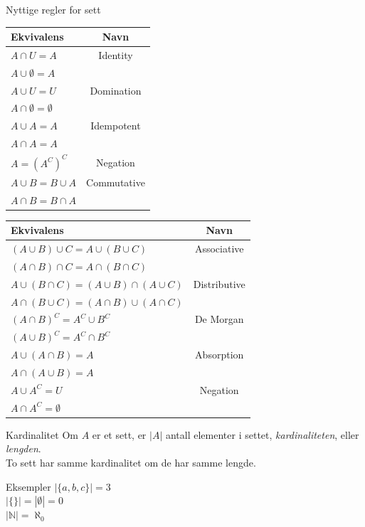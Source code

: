 \begin{frame}{Nyttige regler for sett}
        \begin{tabular}{l|c}
        Ekvivalens & Navn \\ \hline
        $A \cap U = A$ & Identity\\
        $A \cup \emptyset = A$ \\ \hline
        
        $A \cup U = U$ & Domination\\
        $A \cap \emptyset = \emptyset$\\ \hline
        
        $A \cup A = A$ & Idempotent\\
        $A \cap A = A$ \\ \hline
        
        $A = (A^C)^C$ & Negation\\ \hline
        
        $A \cup B = B \cup A$ & Commutative\\
        $A \cap B = B \cap A$ \\

    \end{tabular}
    \hfill
        \begin{tabular}{l|c}
        Ekvivalens & Navn \\ \hline
        
        $(A \cup B) \cup C = A \cup (B \cup C)$ & Associative\\
        $(A \cap B) \cap C = A \cap (B \cap C)$ \\ \hline
        
        $A \cup (B \cap C) = (A \cup B) \cap (A \cup C)$ & Distributive\\
        $A \cap (B \cup C) = (A \cap B) \cup (A \cap C)$ \\ \hline
        
        $(A \cap B)^C = A^C \cup B^C$ & De Morgan \\
        $(A \cup B)^C = A^C \cap B^C$ \\ \hline
        
        $A \cup (A \cap B) = A$ & Absorption \\
        $A \cap (A \cup B) = A$ \\ \hline
        
        $A \cup A^C = U$ & Negation \\
        $A \cap A^C = \emptyset$ \\
        \end{tabular}
\end{frame}

\begin{frame}{Kardinalitet}
    Om $A$ er et sett, er $|A|$ antall elementer i settet, \textit{kardinaliteten}, eller \textit{lengden}.\\
    To sett har samme kardinalitet om de har samme lengde.
    \begin{block}{Eksempler}
        $|\{a, b, c\}| = 3$ \\
        $|\{\}| = |\emptyset| = 0$\\
        $|\mathbb{N}| = \aleph_0$
    \end{block}
\end{frame}